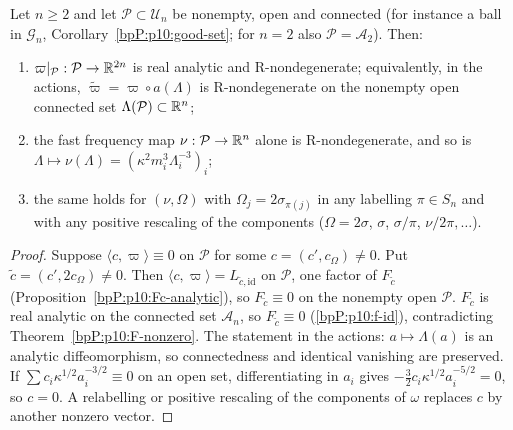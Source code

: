 \begin{theorem}\label{bpP:p10:rnd}
Let $n\ge2$ and let $\mathcal P\subset\mathcal U_n$ be nonempty, open and connected (for instance a ball in $\mathcal G_n$, Corollary~\ref{bpP:p10:good-set}; for $n=2$ also $\mathcal P=\mathcal A_2$). Then:
\begin{enumerate}[label=(\alph*)]
\item $\varpi|_{\mathcal P}:\mathcal P\to\mathbb{R}^{2n}$ is real analytic and R-nondegenerate; equivalently, in the actions, $\tilde\varpi=\varpi\circ a(\Lambda)$ is R-nondegenerate on the nonempty open connected set $\Lambda(\mathcal P)\subset\mathbb{R}^n$;
\item the fast frequency map $\nu:\mathcal P\to\mathbb{R}^n$ alone is R-nondegenerate, and so is $\Lambda\mapsto\nu(\Lambda)=(\kappa^2m_i^3\Lambda_i^{-3})_i$;
\item the same holds for $(\nu,\Omega)$ with $\Omega_j=2\sigma_{\pi(j)}$ in any labelling $\pi\in S_n$ and with any positive rescaling of the components ($\Omega=2\sigma$, $\sigma$, $\sigma/\pi$, $\nu/2\pi,\dots$).
\end{enumerate}
\end{theorem}
\begin{proof}
\label{stepP:p10:rnd-a} Suppose $\langle c,\varpi\rangle\equiv0$ on $\mathcal P$ for some $c=(c',c_\Omega)\ne0$. Put $\tilde c=(c',2c_\Omega)\ne0$. Then $\langle c,\varpi\rangle=L_{\tilde c,\mathrm{id}}$ on $\mathcal P$, one factor of $F_{\tilde c}$ (Proposition~\ref{bpP:p10:Fc-analytic}), so $F_{\tilde c}\equiv0$ on the nonempty open $\mathcal P$. $F_{\tilde c}$ is real analytic on the connected set $\mathcal A_n$, so $F_{\tilde c}\equiv0$ (\ref{bpP:p10:f-id}), contradicting Theorem~\ref{bpP:p10:F-nonzero}. The statement in the actions: $a\mapsto\Lambda(a)$ is an analytic diffeomorphism, so connectedness and identical vanishing are preserved.
\label{stepP:p10:rnd-b} If $\sum c_i\kappa^{1/2}a_i^{-3/2}\equiv0$ on an open set, differentiating in $a_i$ gives $-\tfrac32c_i\kappa^{1/2}a_i^{-5/2}=0$, so $c=0$.
\label{stepP:p10:rnd-c} A relabelling or positive rescaling of the components of $\omega$ replaces $c$ by another nonzero vector.
\end{proof}

